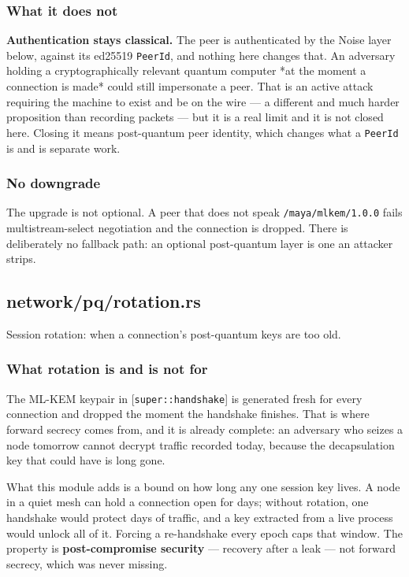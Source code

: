 \documentclass[11pt,a4paper]{article}
\begin{document}
\subsubsection{What it does not}

\textbf{Authentication stays classical.} The peer is authenticated by the Noise
layer below, against its ed25519 \texttt{PeerId}, and nothing here changes that. An
adversary holding a cryptographically relevant quantum computer *at the
moment a connection is made* could still impersonate a peer. That is an
active attack requiring the machine to exist and be on the wire — a
different and much harder proposition than recording packets — but it is a
real limit and it is not closed here. Closing it means post-quantum peer
identity, which changes what a \texttt{PeerId} is and is separate work.

\subsubsection{No downgrade}

The upgrade is not optional. A peer that does not speak \texttt{/maya/mlkem/1.0.0}
fails multistream-select negotiation and the connection is dropped. There is
deliberately no fallback path: an optional post-quantum layer is one an
attacker strips.

\subsection{network/pq/rotation.rs}
Session rotation: when a connection's post-quantum keys are too old.

\subsubsection{What rotation is and is not for}

The ML-KEM keypair in [\texttt{super::handshake}] is generated fresh for every
connection and dropped the moment the handshake finishes. That is where
forward secrecy comes from, and it is already complete: an adversary who
seizes a node tomorrow cannot decrypt traffic recorded today, because the
decapsulation key that could have is long gone.

What this module adds is a bound on how long any one session key lives. A
node in a quiet mesh can hold a connection open for days; without rotation,
one handshake would protect days of traffic, and a key extracted from a live
process would unlock all of it. Forcing a re-handshake every epoch caps that
window. The property is \textbf{post-compromise security} — recovery after a
leak — not forward secrecy, which was never missing.
\end{document}
